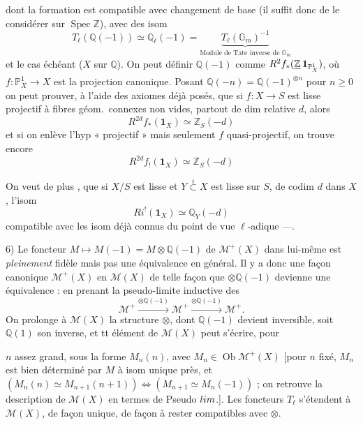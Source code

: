 \documentclass[11pt,a4paper]{article}
\begin{document}
dont la formation est compatible avec changement de base (il suffit donc de
le considérer sur $\operatorname{Spec} \mathbb{Z}$), avec des isom
\[
  T_{\ell}(\mathbb{Q}(-1)) \simeq \mathbb{Q}_{\ell}(-1)
  = \underbrace{T_{\ell}(\mathbb{G}_{m})^{-1}}_{\text{Module de Tate inverse de } \mathbb{G}_{m}}
\]
et le cas échéant ($X$ sur $\mathbb{Q}$). On peut définir
$\mathbb{Q}(-1)$ comme $R^{2} f_{*}(\struck{\mathbb{Z}}\, \mathbf{1}_{\mathbb{P}^{1}_{X}})$,
où $f : \mathbb{P}^{1}_{X} \to X$ est la projection canonique. Posant
$\mathbb{Q}(-n) = \mathbb{Q}(-1)^{\otimes n}$ pour $n \geqslant 0$ on peut
prouver, à l'aide des axiomes déjà posés, que si $f : X \to S$ est lisse
projectif à fibres géom.\ connexes non vides, partout de dim
relative $d$, alors
\[
  R^{2d} f_{*}(\mathbf{1}_{X}) \simeq \mathbb{Z}_{S}(-d)
\]
et si on enlève l'hyp « projectif » mais seulement $f$ quasi-projectif, on
trouve encore
\[
  R^{2d} f_{!}(\mathbf{1}_{X}) \simeq \mathbb{Z}_{S}(-d)
\]

On veut  de plus , que si $X/S$ est lisse
et $Y \overset{i}{\subset} X$ est lisse sur $S$, de codim $d$ dans $X$,
l'isom
\[
  Ri^{!}(\mathbf{1}_{X}) \simeq \mathbb{Q}_{Y}(-d)
\]
compatible avec les isom déjà connus du point de vue $\ell$-adique —.

6)  Le foncteur
$M \mapsto M(-1) = M \otimes \mathbb{Q}(-1)$ de $\mathcal{M}^{+}(X)$ dans
lui-même est \emph{pleinement} fidèle mais pas une équivalence en général. Il
y a donc une façon canonique  $\mathcal{M}^{+}(X)$ en
$\mathcal{M}(X)$ de telle façon que $\otimes \mathbb{Q}(-1)$ devienne une
équivalence : en prenant la pseudo-limite inductive des
\[
  \mathcal{M}^{+} \xrightarrow{\otimes \mathbb{Q}(-1)} \mathcal{M}^{+}
  \xrightarrow{\otimes \mathbb{Q}(-1)} \mathcal{M}^{+} .
\]
On prolonge à $\mathcal{M}(X)$ la structure $\otimes$, dont $\mathbb{Q}(-1)$
devient inversible, soit $\mathbb{Q}(1)$ son inverse, et tt élément de
$\mathcal{M}(X)$ peut s'écrire, pour

$n$ assez grand, sous la forme $M_{n}(n)$, avec
$M_{n} \in \operatorname{Ob} \mathcal{M}^{+}(X)$ [pour $n$ fixé, $M_{n}$ est
bien déterminé par $M$ à isom unique près, et
$(M_{n}(n) \simeq M_{n+1}(n+1)) \Leftrightarrow (M_{n+1} \simeq M_{n}(-1))$ ;
on retrouve la description de $\mathcal{M}(X)$ en termes de Pseudo
$\varinjlim$.]. Les foncteurs $T_{\ell}$ s'étendent à $\mathcal{M}(X)$, de
façon unique, de façon à rester compatibles avec $\otimes$.
\end{document}
